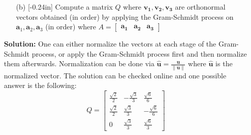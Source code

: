 \documentclass[letterpaper,12pt]{article}
\theoremstyle{definition}
\begin{document}
\newpage
\begin{enumerate}
    \item[] \begin{enumerate}
        \item[(b)]\reversemarginpar{}[-0.24in] Compute a matrix $Q$ where $\mathbf{v_1},\mathbf{v_2},\mathbf{v_3}$ are orthonormal vectors obtained (in order) by applying the Gram-Schmidt process on $
        \mathbf{a}_1, \mathbf{a}_2, \mathbf{a}_3$ (in order) where $A = \begin{bmatrix}
            \mathbf{a_1} & \mathbf{a_2} & \mathbf{a_3}
        \end{bmatrix}$
    \end{enumerate}
    \begin{mdframed}
        \textbf{Solution:} One can either normalize the vectors at each stage of the Gram-Schmidt process, or apply the Gram-Schmidt process first and then normalize them afterwards. Normalization can be done via $\hat{\mathbf{u}} = \frac{\mathbf{u}}{\| \mathbf{u} \|}$ where $\hat{\mathbf{u}}$ is the normalized vector. The solution can be checked online and one possible answer is the following:
        $$Q = \begin{bmatrix}
            \frac{\sqrt{2}}{2} &-\frac{\sqrt{3}}{3} & \frac{\sqrt{6}}{6} \\
            \frac{\sqrt{2}}{2}& \frac{\sqrt{3}}{3} & -\frac{\sqrt{6}}{6} \\
            0 & \frac{\sqrt{3}}{3} & \frac{\sqrt{6}}{3}
        \end{bmatrix}$$
    \end{mdframed}
\end{enumerate}
\newpage
\end{document}
